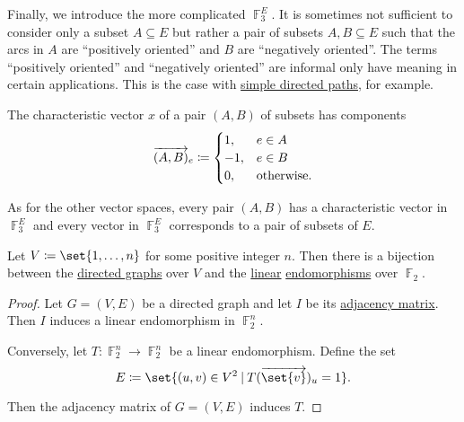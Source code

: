 \begin{definition}
\begin{thmenum}
     Finally, we introduce the more complicated  \( \BbbF_3^E \). It is sometimes not sufficient to consider only a subset \( A \subseteq E \) but rather a pair of subsets \( A, B \subseteq E \) such that the arcs in \( A \) are \enquote{positively oriented} and \( B \) are \enquote{negatively oriented}. The terms \enquote{positively oriented} and \enquote{negatively oriented} are informal only have meaning in certain applications. This is the case with \hyperref[def:graph_paths/directed_path]{simple directed paths}, for example.

    The characteristic vector \( x \) of a pair \( (A, B) \) of subsets has components
    \begin{equation*}
      \vect{(A, B)}_e \coloneqq \begin{cases}
        1,  &e \in A \\
        -1, &e \in B \\
        0,  &\T{otherwise.}
      \end{cases}
    \end{equation*}

    As for the other vector spaces, every pair \( (A, B) \) has a characteristic vector in \( \BbbF_3^E \) and every vector in \( \BbbF_3^E \) corresponds to a pair of subsets of \( E \).
  \end{thmenum}
\end{definition}

\begin{proposition}\label{thm:graphs_as_linear_transformations}
  Let \( V \coloneqq \set{ 1, \ldots, n } \) for some positive integer \( n \). Then there is a bijection between the \hyperref[def:graph/directed]{directed graphs} over \( V \) and the \hyperref[def:linear_operator]{linear} \hyperref[def:endomorphism]{endomorphisms} over \( \BbbF_2 \).
\end{proposition}
\begin{proof}
  Let \( G = (V, E) \) be a directed graph and let \( I \) be its \hyperref[def:graph_matrices/adjacency]{adjacency matrix}. Then \( I \) induces a linear endomorphism in \( \BbbF_2^n \).

  Conversely, let \( T: \BbbF_2^n \to \BbbF_2^n \) be a linear endomorphism. Define the set
  \begin{equation*}
    E \coloneqq \set{ (u, v) \in V^2 \given T(\vect{\set{v}})_u = 1 }.
  \end{equation*}

  Then the adjacency matrix of \( G = (V, E) \) induces \( T \).
\end{proof}


